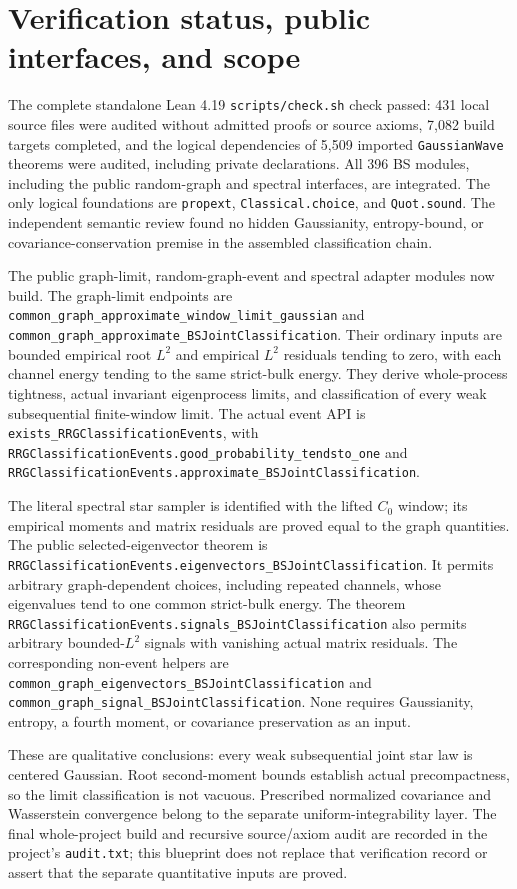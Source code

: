 \documentclass[11pt]{article}
\newcommand{\lean}[1]{{\small\nolinkurl{#1}}}
\begin{document}
\section{Verification status, public interfaces, and scope}
The complete standalone Lean 4.19 \lean{scripts/check.sh} check passed:
431 local source files were audited without admitted proofs or source
axioms, 7,082 build targets completed, and the logical dependencies of
5,509 imported \lean{GaussianWave} theorems were audited, including private
declarations. All 396 BS modules, including the public random-graph and
spectral interfaces, are integrated. The only logical foundations are
\lean{propext}, \lean{Classical.choice}, and \lean{Quot.sound}.
The independent semantic review found no hidden Gaussianity, entropy-bound,
or covariance-conservation premise in the assembled classification chain.

The public graph-limit, random-graph-event and spectral adapter modules
now build. The graph-limit endpoints
are \lean{common_graph_approximate_window_limit_gaussian} and
\lean{common_graph_approximate_BSJointClassification}. Their ordinary
inputs are bounded empirical root $L^2$ and empirical $L^2$ residuals tending
to zero, with each channel energy tending to the same strict-bulk energy.
They derive whole-process tightness, actual invariant eigenprocess limits,
and classification of every weak subsequential finite-window limit.
The actual event API is \lean{exists_RRGClassificationEvents}, with
\lean{RRGClassificationEvents.good_probability_tendsto_one} and
\lean{RRGClassificationEvents.approximate_BSJointClassification}.

The literal spectral star sampler is identified with the lifted $C_0$
window; its empirical moments and matrix residuals are proved equal to the
graph quantities. The public selected-eigenvector theorem is
\lean{RRGClassificationEvents.eigenvectors_BSJointClassification}.
It permits arbitrary graph-dependent choices, including repeated channels,
whose eigenvalues tend to one common strict-bulk energy. The theorem
\lean{RRGClassificationEvents.signals_BSJointClassification} also permits
arbitrary bounded-$L^2$ signals with vanishing actual matrix residuals.
The corresponding non-event helpers are
\lean{common_graph_eigenvectors_BSJointClassification} and
\lean{common_graph_signal_BSJointClassification}. None requires Gaussianity,
entropy, a fourth moment, or covariance preservation as an input.

These are qualitative conclusions: every weak subsequential joint star
law is centered Gaussian. Root second-moment bounds establish actual
precompactness, so the limit classification is not vacuous. Prescribed
normalized covariance and Wasserstein convergence belong to the separate
uniform-integrability layer. The final whole-project build and recursive
source/axiom audit are recorded in the project's \lean{audit.txt}; this
blueprint does not replace that verification record or assert that the
separate quantitative inputs are proved.
\end{document}
